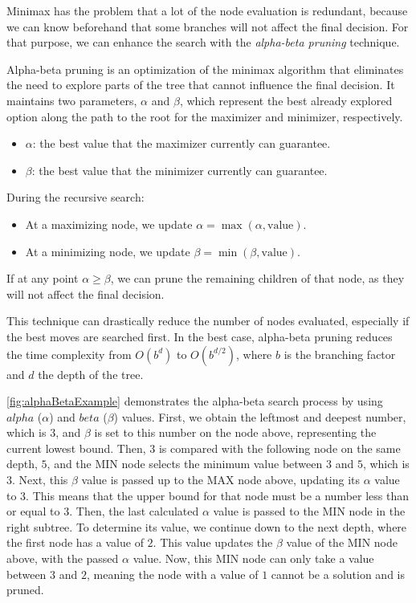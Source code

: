 Minimax has the problem that a lot of the node evaluation is redundant, because we can know beforehand that some branches will not affect the final decision. For that purpose, we can enhance the search with the \textit{alpha-beta pruning} technique. 

\vspace{1em}

\noindent Alpha-beta pruning is an optimization of the minimax algorithm that eliminates the need to explore parts of the tree that cannot influence the final decision. It maintains two parameters, \(\alpha\) and \(\beta\), which represent the best already explored option along the path to the root for the maximizer and minimizer, respectively.

\begin{itemize}
    \item \(\alpha\): the best value that the maximizer currently can guarantee.
    \item \(\beta\): the best value that the minimizer currently can guarantee.
\end{itemize}

During the recursive search:
\begin{itemize}
    \item At a maximizing node, we update \(\alpha = \operatorname{max}(\alpha, \text{value})\).
    \item At a minimizing node, we update \(\beta = \operatorname{min}(\beta, \text{value})\).
\end{itemize}

If at any point \(\alpha \geq \beta\), we can prune the remaining children of that node, as they will not affect the final decision.

\vspace{1em}

This technique can drastically reduce the number of nodes evaluated, especially if the best moves are searched first. In the best case, alpha-beta pruning reduces the time complexity from \(O(b^d)\) to \(O(b^{d/2})\), where \(b\) is the branching factor and \(d\) the depth of the tree.

\vspace{1em}

\noindent\cref{fig:alphaBetaExample} demonstrates the alpha-beta search process by using $alpha$ ($\alpha$) and $beta$ ($\beta$) values. First, we obtain the leftmost and deepest number, which is $3$, and $\beta$ is set to this number on the node above, representing the current lowest bound. Then, $3$ is compared with the following node on the same depth, $5$, and the MIN node selects the minimum value between $3$ and $5$, which is $3$. Next, this $\beta$ value is passed up to the MAX node above, updating its $\alpha$ value to $3$. This means that the upper bound for that node must be a number less than or equal to $3$. Then, the last calculated $\alpha$ value is passed to the MIN node in the right subtree. To determine its value, we continue down to the next depth, where the first node has a value of $2$. This value updates the $\beta$ value of the MIN node above, with the passed $\alpha$ value. Now, this MIN node can only take a value between $3$ and $2$, meaning the node with a value of $1$ cannot be a solution and is pruned.

